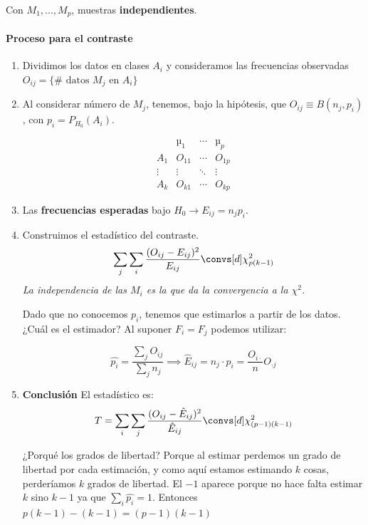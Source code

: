 Con $M_1,...,M_p$, muestras \textbf{independientes}.

\paragraph{Proceso para el contraste}
\begin{enumerate}

\label{contraste::homogeneidad::chicuadrado}

\item Dividimos los datos en clases $A_i$ y consideramos las frecuencias observadas $O_{ij} = \{\#\text{ datos } M_j \text{ en } A_i \}$

\item Al considerar número de $M_j$, tenemos, bajo la hipótesis, que $O_{ij} \equiv B(n_j,p_i)$, con $p_i = P_{H_0}(A_i)$.

\begin{defn}
\[
\begin{array}{c|ccc}
&µ_1&\cdots & µ_p \\\hline
A_1 & O_{11} & \cdots & O_{1p}\\
\vdots & \vdots & \ddots & \vdots \\
A_k & O_{k1} & \cdots & O_{kp} 
\end{array}
\]
\end{defn}

\item Las \textbf{frecuencias esperadas} bajo $H_0 \to E_{ij} = n_jp_i$.

\item Construimos el estadístico del contraste. \[\sum_j \sum_i \frac{(O_{ij} - E_{ij})^2}{E_{ij}} \convs[d] \chi^2_{p(k-1)}\]
\subitem \textit{La independencia de las $M_i$ es la que da la convergencia a la $\chi^2$.}

\subitem Dado que no conocemos $p_i$, tenemos que estimarlos a partir de los datos. ¿Cuál es el estimador? Al suponer $F_i = F_j$ podemos utilizar:

\[ \hat{p_i} = \frac{\sum_j O_{ij}}{\sum_j n_j} \implies \hat{E}_{ij} = n_j·p_i = \frac{O_{i·}}{n}O_{·j}\]

\item \textbf{Conclusión} El estadístico es: \[T = \sum_i \sum_j \frac{(O_{ij} - \hat{E}_{ij})^2}{\hat{E}_{ij}} \convs[d] \chi^2_{(p-1)(k-1)} \] 

\subitem ¿Porqué los grados de libertad? Porque al estimar perdemos un grado de libertad por cada estimación, y como aquí estamos estimando $k$ cosas, perderíamos $k$ grados de libertad. El $-1$ aparece porque no hace falta estimar $k$ sino $k-1$ ya que $\sum_i \hat{p_i} = 1$. Entonces $p(k-1) - (k-1) = (p-1)(k-1)$


\end{enumerate}

